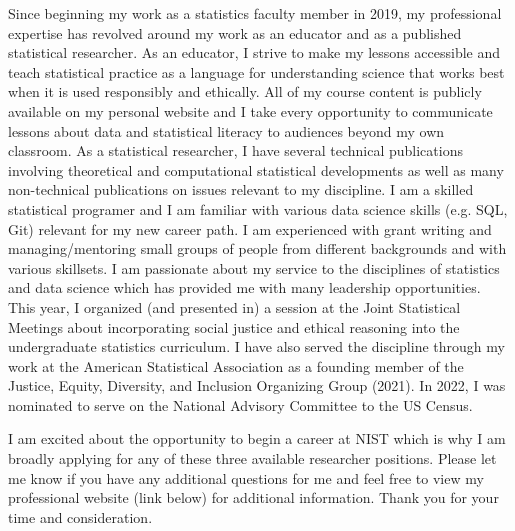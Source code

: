 \documentclass[11pt,a4paper,sans]{moderncv}
\begin{document}
Since beginning my work as a statistics faculty member in 2019, my professional expertise has revolved around my work as an educator and as a published statistical researcher. As an educator, I strive to make my lessons accessible and teach statistical practice as a language for understanding science that works best when it is used responsibly and ethically. All of my course content is publicly available on my personal website and I take every opportunity to communicate lessons about data and statistical literacy to audiences beyond my own classroom. As a statistical researcher, I have several technical publications involving theoretical and computational statistical developments as well as many non-technical publications on issues relevant to my discipline. I am a skilled statistical programer and I am familiar with various data science skills (e.g. SQL, Git) relevant for my new career path. I am experienced with grant writing and managing/mentoring small groups of people from different backgrounds and with various skillsets. %
I am passionate about my service to the disciplines of statistics and data science which has provided me with many leadership opportunities. This year, I organized (and presented in) a session at the Joint Statistical Meetings  about incorporating social justice and ethical reasoning into the undergraduate statistics curriculum. I have also served the discipline through my work at the American Statistical Association as a founding member of the Justice, Equity, Diversity, and Inclusion Organizing Group (2021). In 2022, I was nominated to serve on the National Advisory Committee to the US Census.   
	
	
	\vspace{2mm} 
	
	I am excited about the opportunity to begin a career at NIST which is why I am broadly applying for any of these three available researcher positions. Please let me know if you have any additional questions for me and feel free to view my professional website (link below) for additional information. Thank you for your time and consideration.\\
	
	\vspace{3mm}
	
	\makeletterclosing
	
\end{document}
